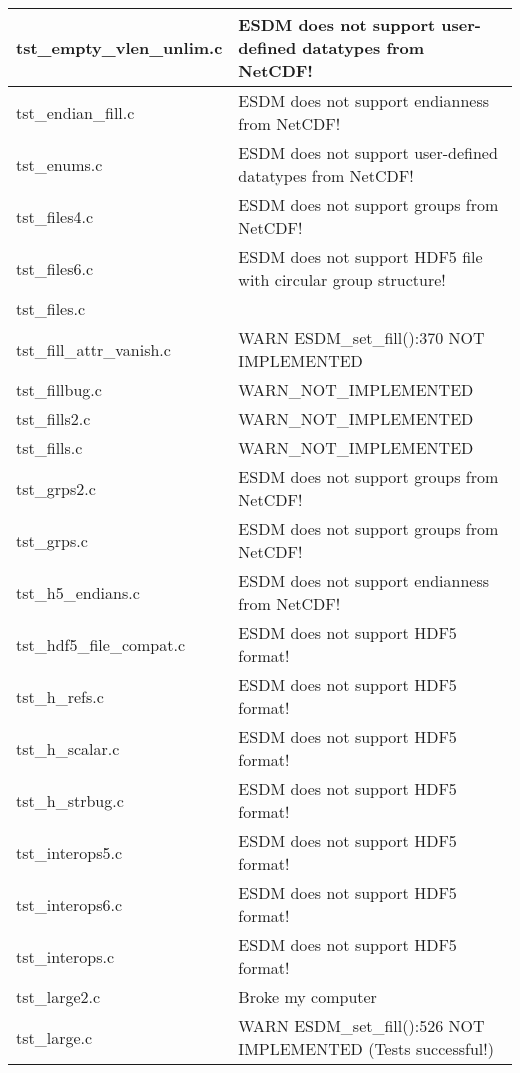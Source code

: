 \begin{table}[H]
\begin{tabular}{|l|l|}
tst\_empty\_vlen\_unlim.c   &  ESDM does not support user-defined datatypes from NetCDF!    \\ \hline
tst\_endian\_fill.c   &    ESDM does not support endianness from NetCDF! \\ \hline
tst\_enums.c   &   ESDM does not support user-defined datatypes from NetCDF!   \\ \hline
tst\_files4.c   &   ESDM does not support groups from NetCDF!    \\ \hline
tst\_files6.c   &  ESDM does not support HDF5 file with circular group structure!    \\ \hline
tst\_files.c   &       \\ \hline
tst\_fill\_attr\_vanish.c   &   WARN ESDM\_set\_fill():370 NOT IMPLEMENTED    \\ \hline
tst\_fillbug.c   &  WARN\_NOT\_IMPLEMENTED     \\ \hline
tst\_fills2.c   &   WARN\_NOT\_IMPLEMENTED    \\ \hline
tst\_fills.c   &    WARN\_NOT\_IMPLEMENTED   \\ \hline
tst\_grps2.c   &   ESDM does not support groups from NetCDF!    \\ \hline
tst\_grps.c   &    ESDM does not support groups from NetCDF!   \\ \hline
tst\_h5\_endians.c   &   ESDM does not support endianness from NetCDF!  \\ \hline
tst\_hdf5\_file\_compat.c   &  ESDM does not support HDF5 format!     \\ \hline
tst\_h\_refs.c   &   ESDM does not support HDF5 format!    \\ \hline
tst\_h\_scalar.c   &  ESDM does not support HDF5 format!    \\ \hline
tst\_h\_strbug.c   &  ESDM does not support HDF5 format!     \\ \hline
tst\_interops5.c   &   ESDM does not support HDF5 format!    \\ \hline
tst\_interops6.c   &   ESDM does not support HDF5 format!    \\ \hline
tst\_interops.c   &   ESDM does not support HDF5 format!    \\ \hline
tst\_large2.c   &   Broke my computer    \\ \hline
tst\_large.c   &   WARN ESDM\_set\_fill():526 NOT IMPLEMENTED (Tests successful!)   \\ \hline
\hline
\end{tabular}
\caption{}
\end{table}

